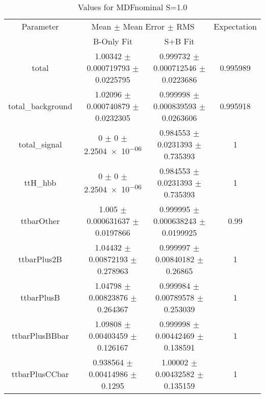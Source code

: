 \begin{table}
\centering
\caption{Values for MDFnominal S=1.0}
\begin{tabular}{cccc}
\toprule
Parameter & \multicolumn{2}{c}{Mean $\pm$ Mean Error $\pm$ RMS} & Expectation\\
 & B-Only Fit & S+B Fit & \\
\midrule
total & \num{1.00342} $\pm$ \num{0.000719793} $\pm$ \num{0.0225795} & \num{0.999732} $\pm$ \num{0.000712546} $\pm$ \num{0.0223686} & \num{0.995989}\\
total\_background & \num{1.02096} $\pm$ \num{0.000740879} $\pm$ \num{0.0232305} & \num{0.999998} $\pm$ \num{0.000839593} $\pm$ \num{0.0263606} & \num{0.995918}\\
total\_signal & \num{0} $\pm$ \num{0} $\pm$ \num{2.2504e-06} & \num{0.984553} $\pm$ \num{0.0231393} $\pm$ \num{0.735393} & \num{1}\\
ttH\_hbb & \num{0} $\pm$ \num{0} $\pm$ \num{2.2504e-06} & \num{0.984553} $\pm$ \num{0.0231393} $\pm$ \num{0.735393} & \num{1}\\
ttbarOther & \num{1.005} $\pm$ \num{0.000631637} $\pm$ \num{0.0197866} & \num{0.999995} $\pm$ \num{0.000638243} $\pm$ \num{0.0199925} & \num{0.99}\\
ttbarPlus2B & \num{1.04432} $\pm$ \num{0.00872193} $\pm$ \num{0.278963} & \num{0.999997} $\pm$ \num{0.00840182} $\pm$ \num{0.26865} & \num{1}\\
ttbarPlusB & \num{1.04798} $\pm$ \num{0.00823876} $\pm$ \num{0.264367} & \num{0.999984} $\pm$ \num{0.00789578} $\pm$ \num{0.253039} & \num{1}\\
ttbarPlusBBbar & \num{1.09808} $\pm$ \num{0.00403459} $\pm$ \num{0.126167} & \num{0.999998} $\pm$ \num{0.00442469} $\pm$ \num{0.138591} & \num{1}\\
ttbarPlusCCbar & \num{0.938564} $\pm$ \num{0.00414986} $\pm$ \num{0.1295} & \num{1.00002} $\pm$ \num{0.00432582} $\pm$ \num{0.135159} & \num{1}\\
\bottomrule
\end{tabular}
\end{table}